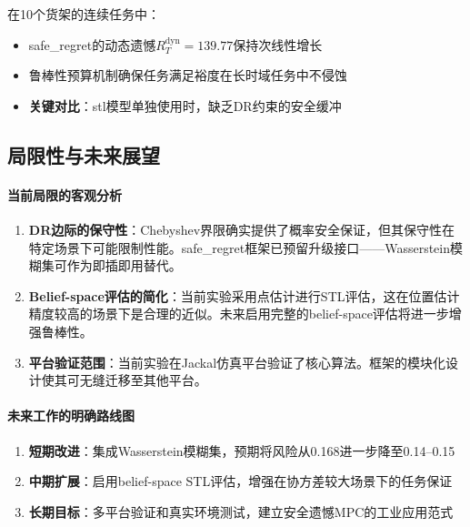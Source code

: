 \documentclass[12pt,a4paper]{ctexart}
\numberwithin{equation}{section}
\begin{document}
在10个货架的连续任务中：
\begin{itemize}
    \item safe\_regret的动态遗憾$R_T^{\mathrm{dyn}} = 139.77$保持次线性增长
    \item 鲁棒性预算机制确保任务满足裕度在长时域任务中不侵蚀
    \item \textbf{关键对比}：stl模型单独使用时，缺乏DR约束的安全缓冲
\end{itemize}

\subsection{局限性与未来展望}

\paragraph*{当前局限的客观分析}

\begin{enumerate}[label=(\arabic*)]
    \item \textbf{DR边际的保守性}：Chebyshev界限确实提供了概率安全保证，但其保守性在特定场景下可能限制性能。safe\_regret框架已预留升级接口——Wasserstein模糊集可作为即插即用替代。

    \item \textbf{Belief-space评估的简化}：当前实验采用点估计进行STL评估，这在位置估计精度较高的场景下是合理的近似。未来启用完整的belief-space评估将进一步增强鲁棒性。

    \item \textbf{平台验证范围}：当前实验在Jackal仿真平台验证了核心算法。框架的模块化设计使其可无缝迁移至其他平台。
\end{enumerate}

\paragraph*{未来工作的明确路线图}

\begin{enumerate}[label=(\arabic*)]
    \item \textbf{短期改进}：集成Wasserstein模糊集，预期将风险从0.168进一步降至0.14--0.15
    \item \textbf{中期扩展}：启用belief-space STL评估，增强在协方差较大场景下的任务保证
    \item \textbf{长期目标}：多平台验证和真实环境测试，建立安全遗憾MPC的工业应用范式
\end{enumerate}

\clearpage
\end{document}
